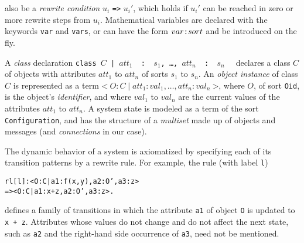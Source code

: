 also be a \emph{rewrite condition} $u_i\,\,$\texttt{=>}$\,\,u_i'$,
which holds if $u_i'$ can be reached in
zero or more rewrite steps from  $u_i$. 
Mathematical variables %
 are declared with the keywords {\tt var} and {\tt vars}, 
 or can have the form $var\verb+:+sort$ and be introduced on the fly.



A \emph{class} declaration \texttt{class \(C\) |
  \(\mathit{att}_1\)\,\,:\,\,\(\mathit{s}_1\), \dots ,
  \(\mathit{att}_n\)\,\,:\,\,\(\mathit{s}_n\)\,\,} 
declares a class $C$ of objects with attributes $att_1$ to $att_n$ of
sorts $s_1$ 
to $s_n$. An {\em object instance\/} of class $C$  is
represented as a term
$\texttt{<}\: O : C \mid \mathit{att}_1: \mathit{val}_1, \dots , \mathit{att}_n: \mathit{val}_n\:\texttt{>}$,
where $O$, of sort \texttt{Oid},  is the
object's
\emph{identifier}, and where $val_1$ to 
$val_n$ are the current values of the attributes $att_1$ to
$att_n$.
A system state
 is modeled as a term of 
the sort \texttt{Configuration}, and   has 
the structure of a  \emph{multiset} made up of objects and messages
(and \emph{connections} in our case). 

The dynamic behavior of a
 system is axiomatized by specifying each of its 
transition patterns by a rewrite rule. For example, 
  the rule (with label \texttt{l})

\small
\begin{alltt}
  rl [l] :  < O : C | a1 : f(x, y), a2 : O', a3 : z >
       =>   < O : C | a1 : x + z,   a2 : O', a3 : z > .
\end{alltt}
\normalsize

\noindent  defines a family of transitions 
in which the attribute \texttt{a1} of object \texttt{O} is updated to \texttt{x\,+\,z}. 
Attributes whose values do not change and do not affect
the next state,  
 such as \texttt{a2} and the right-hand side occurrence of \texttt{a3}, need not be mentioned. %

